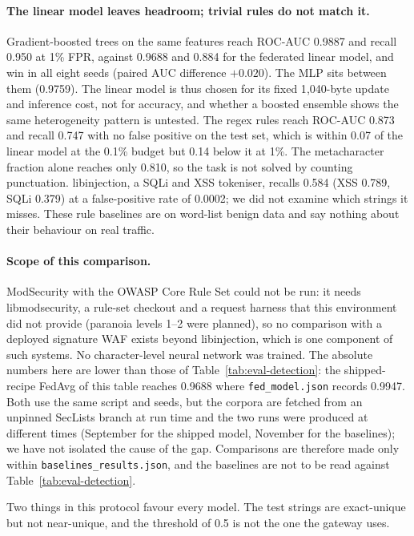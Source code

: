 \paragraph{The linear model leaves headroom; trivial rules do not match it.}
Gradient-boosted trees on the same features reach ROC-AUC 0.9887 and recall 0.950 at 1\% FPR, against 0.9688 and 0.884 for the federated linear model, and win in all eight seeds (paired AUC difference $+0.020$). The MLP sits between them (0.9759). The linear model is thus chosen for its fixed 1{,}040-byte update and inference cost, not for accuracy, and whether a boosted ensemble shows the same heterogeneity pattern is untested. The regex rules reach ROC-AUC 0.873 and recall 0.747 with no false positive on the test set, which is within 0.07 of the linear model at the 0.1\% budget but 0.14 below it at 1\%. The metacharacter fraction alone reaches only 0.810, so the task is not solved by counting punctuation. libinjection, a SQLi and XSS tokeniser, recalls 0.584 (XSS 0.789, SQLi 0.379) at a false-positive rate of 0.0002; we did not examine which strings it misses. These rule baselines are on word-list benign data and say nothing about their behaviour on real traffic.

\paragraph{Scope of this comparison.}
ModSecurity with the OWASP Core Rule Set could not be run: it needs libmodsecurity, a rule-set checkout and a request harness that this environment did not provide (paranoia levels 1--2 were planned), so no comparison with a deployed signature WAF exists beyond libinjection, which is one component of such systems. No character-level neural network was trained. The absolute numbers here are lower than those of Table~\ref{tab:eval-detection}: the shipped-recipe FedAvg of this table reaches 0.9688 where \texttt{fed\_model.json} records 0.9947. Both use the same script and seeds, but the corpora are fetched from an unpinned SecLists branch at run time and the two runs were produced at different times (September for the shipped model, November for the baselines); we have not isolated the cause of the gap. Comparisons are therefore made only within \texttt{baselines\_results.json}, and the baselines are not to be read against Table~\ref{tab:eval-detection}.

Two things in this protocol favour every model. The test strings are exact-unique but not near-unique, and the threshold of 0.5 is not the one the gateway uses.


